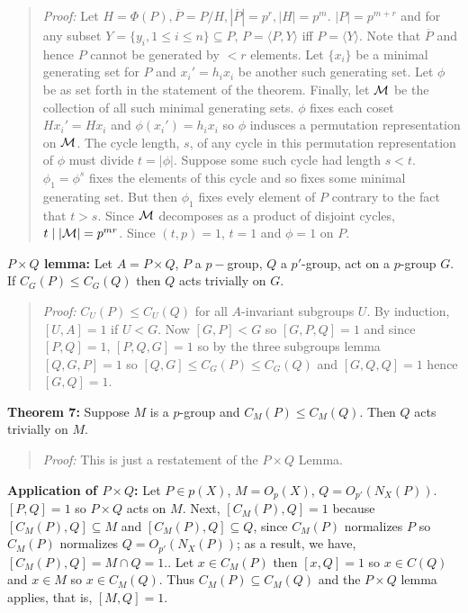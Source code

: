 \begin{quote}
\emph{Proof:}  
Let $H= \Phi(P), {\overline P}= P/H, |{\overline P}|= p^r, |H|= p^m$.
$|P|= p^{m+r}$ and for any subset $Y= \{ y_i, 1 \le i \le n \} \subseteq P$,
$P= \langle P, Y \rangle$ iff $P= \langle Y \rangle$.  Note that ${\overline P}$ and
hence $P$ cannot be generated by $<r$ elements.  Let $\{ x_i \}$ be a minimal generating
set for $P$ and $x_i'= h_i x_i$ be another such generating set.  Let $\phi$ be as set forth in the
statement of the theorem.  Finally, let ${\cal M}$ be the collection of all such minimal generating
sets.  $\phi$ fixes each coset  $H x_i'= H x_i$ and $\phi(x_i')= h_i x_i$ so $\phi$
indusces a permutation representation on ${\cal M}$.  The cycle length, $s$, of any cycle in this
permutation representation of $\phi$ must divide $t= | \phi |$.  Suppose some such cycle
had length $s<t$.  $\phi_1= \phi^s$ fixes the elements of this cycle and so fixes some
minimal generating set.  But then $\phi_1$ fixes evely element of $P$ contrary
to the fact that $t>s$.  Since ${\cal M}$ decomposes as a product of disjoint cycles,
$t \mid |{\cal M}| = p^{mr}$.  Since $(t,p)= 1$, $t=1$ and $\phi= 1$ on $P$.
\end{quote}
{\bf $P \times Q$ lemma:} Let $A = P \times Q$, $P$ a $p-$group, $Q$ a $p'$-group, act
on a $p$-group $G$.  If $C_G(P) \le C_G(Q)$ then $Q$ acts trivially on $G$.
\begin{quote}
\emph{Proof:}
$C_U(P) \le C_U(Q)$ for all $A$-invariant subgroups $U$.  By induction, $[U,A]=1$ if
$U < G$.  Now $[G,P] < G$ so $[G, P, Q] = 1$ and since $[P, Q]=1$,
$[P, Q, G]=1$ so by the three subgroups lemma $[Q, G, P]=1$ so
$[Q,G] \le C_G(P) \le C_G(Q)$ and $[G, Q, Q]=1$ hence $[G,Q]=1$.
\end{quote}
{\bf Theorem 7:} Suppose $M$ is a $p$-group and $C_M(P) \le C_M(Q)$.  
Then $Q$ acts trivially on $M$.
\begin{quote}
\emph{Proof:}  This is just a restatement of the $P \times Q$ Lemma.
\end{quote}
{\bf Application of $P \times Q$:}  Let 
$P \in p(X)$, $M=O_p(X)$, $Q= O_{p'}(N_X(P))$.  $[P, Q]=1$ so
$P \times Q$ acts on $M$.  
Next, $[C_M(P), Q] = 1$ because $[C_M(P), Q] \subseteq M$ and $[C_M(P), Q] \subseteq Q$, since
$C_M(P)$ normalizes $P$ so $C_M(P)$ normalizes $Q=O_{p'}(N_X(P))$; as a result, we have,
$[C_M(P), Q] = M \cap Q = 1$..
Let $x \in C_M(P)$ then $[x, Q] = 1$ so $x \in C(Q)$ and $x \in M$ so
$x \in C_M(Q)$.  Thus $C_M(P) \subseteq C_M(Q)$ and the $P \times Q$ lemma applies, that is, $[M,Q]=1$.
